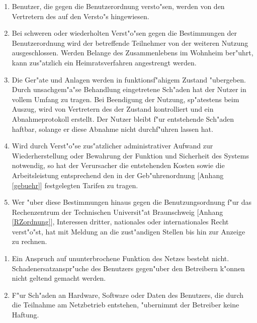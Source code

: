 \begin{enumerate}
  \item Benutzer, die gegen die Benutzerordnung versto"sen, werden von den
      Vertretern des \snev auf den Versto"s hingewiesen.
  \item Bei schweren oder wiederholten Verst"o"sen gegen die Bestimmungen der
      Benutzerordnung wird der betreffende Teilnehmer von der weiteren Nutzung
      ausgeschlossen. Werden Belange des Zusammenlebens im Wohnheim ber"uhrt,
      kann zus"atzlich ein Heimratsverfahren angestrengt werden.
  \item Die Ger"ate und Anlagen werden in funktionsf"ahigem Zustand
      "ubergeben. Durch unsachgem"a"se Behandlung eingetretene Sch"aden hat
      der Nutzer in vollem Umfang zu tragen. Bei Beendigung der Nutzung,
      sp"atestens beim Auszug, wird von Vertretern des \snev der Zustand
      kontrolliert und ein Abnahmeprotokoll erstellt. Der Nutzer bleibt f"ur
      entstehende Sch"aden haftbar, solange er diese Abnahme nicht durchf"uhren
      lassen hat.
  \item Wird durch Verst"o"se zus"atzlicher administrativer Aufwand zur
      Wiederherstellung oder Bewahrung der Funktion und Sicherheit des Systems
      notwendig, so hat der Verursacher die entstehenden Kosten sowie die
      Arbeitsleistung entsprechend den in der Geb"uhrenordnung [Anhang
      \ref{gebuehr}] festgelegten Tarifen zu tragen.
  \item Wer "uber diese Bestimmungen hinaus gegen die Benutzungsordnung f"ur
      das Rechenzentrum der Technischen Universit"at Braunschweig [Anhang
      \ref{RZordnung}], Interessen dritter, nationales oder internationales
      Recht verst"o"st, hat mit Meldung an die zust"andigen Stellen bis hin zur
      Anzeige zu rechnen.
\end{enumerate}

\begin{enumerate}
  \item Ein Anspruch auf ununterbrochene Funktion des Netzes besteht
      nicht. Schadenersatzanspr"uche des Benutzers gegen"uber den Betreibern
      k"onnen nicht geltend gemacht werden.
  \item F"ur Sch"aden an Hardware, Software oder Daten des Benutzers, die
      durch die Teilnahme am Netzbetrieb entstehen, "ubernimmt der Betreiber
      keine Haftung.

\end{enumerate}
